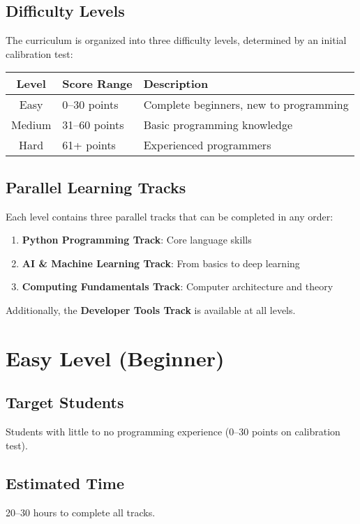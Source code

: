 \documentclass[11pt,letterpaper]{article}
\begin{document}
\subsection{Difficulty Levels}
The curriculum is organized into three difficulty levels, determined by an initial calibration test:

\begin{center}
\begin{tabular}{|c|l|l|}
\hline
\textbf{Level} & \textbf{Score Range} & \textbf{Description} \\
\hline
Easy & 0--30 points & Complete beginners, new to programming \\
Medium & 31--60 points & Basic programming knowledge \\
Hard & 61+ points & Experienced programmers \\
\hline
\end{tabular}
\end{center}

\subsection{Parallel Learning Tracks}
Each level contains three parallel tracks that can be completed in any order:
\begin{enumerate}[leftmargin=*]
    \item \textbf{Python Programming Track}: Core language skills
    \item \textbf{AI \& Machine Learning Track}: From basics to deep learning
    \item \textbf{Computing Fundamentals Track}: Computer architecture and theory
\end{enumerate}

Additionally, the \textbf{Developer Tools Track} is available at all levels.

\section{Easy Level (Beginner)}

\subsection{Target Students}
Students with little to no programming experience (0--30 points on calibration test).

\subsection{Estimated Time}
20--30 hours to complete all tracks.
\end{document}
